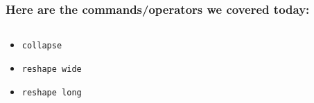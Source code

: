 \documentclass[11pt]{beamer}
\begin{document}
\begin{frame}
\frametitle{Here are the commands/operators we covered today:}
\begin{columns}
	\begin{column}{0.5\textwidth}
		\begin{itemize}
			\item \texttt{collapse}
			\item \texttt{reshape wide}
			\item \texttt{reshape long}
		\end{itemize}
	\end{column}
	\begin{column}{0.5\textwidth}
	\end{column}
\end{columns}
\end{frame}
\end{document}
